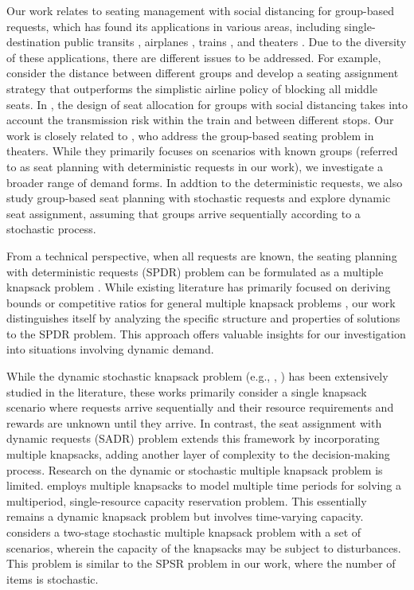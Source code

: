 Our work relates to seating management with social distancing for group-based requests, which has found its applications in various areas, including single-destination public transits \citep{moore2021seat}, airplanes \citep{ghorbani2020model, salari2022social}, trains \citep{haque2022optimization, haque2023social}, and theaters \citep{blom2022filling}. Due to the diversity of these applications, there are different issues to be addressed. For example, \citet{salari2022social} consider the distance between different groups and develop a seating assignment strategy that outperforms the simplistic airline policy of blocking all middle seats. In \citet{haque2023social}, the design of seat allocation for groups with social distancing takes into account the transmission risk within the train and between different stops. Our work is closely related to \citet{blom2022filling}, who address the group-based seating problem in theaters. While they primarily focuses on scenarios with known groups (referred to as seat planning with deterministic requests in our work), we investigate a broader range of demand forms. In addtion to the deterministic requests, we also study group-based seat planning with stochastic requests and explore dynamic seat assignment, assuming that groups arrive sequentially according to a stochastic process.


From a technical perspective, when all requests are known, the seating planning with deterministic requests (SPDR) problem can be formulated as a multiple knapsack problem \citep{martello1990knapsack}. 
While existing literature has primarily focused on deriving bounds or competitive ratios for general
multiple knapsack problems \citep{khuri1994zero, ferreira1996solving, pisinger1999exact, chekuri2005polynomial}, our work distinguishes itself by analyzing the specific structure and properties of solutions to the SPDR problem. This approach offers valuable insights for our investigation into situations involving dynamic demand.


While the dynamic stochastic knapsack problem (e.g., \citet{kleywegt1998dynamic, kleywegt2001dynamic}, \citet{papastavrou1996dynamic}) has been extensively studied in the literature, these works primarily consider a single knapsack scenario where requests arrive sequentially and their resource requirements and rewards are unknown until they arrive. In contrast, the seat assignment with dynamic requests (SADR) problem extends this framework by incorporating multiple knapsacks, adding another layer of complexity to the decision-making process.
Research on the dynamic or stochastic multiple knapsack problem is limited. \citet{perry2009approximate} employs multiple knapsacks to model multiple time periods for solving a multiperiod, single-resource capacity reservation problem. This essentially remains a dynamic knapsack problem but involves time-varying capacity. \citet{tonissen2017column} considers a two-stage stochastic multiple knapsack problem with a set of scenarios, wherein the capacity of the knapsacks may be subject to disturbances. This problem is similar to the SPSR problem in our work, where the number of items is stochastic.


